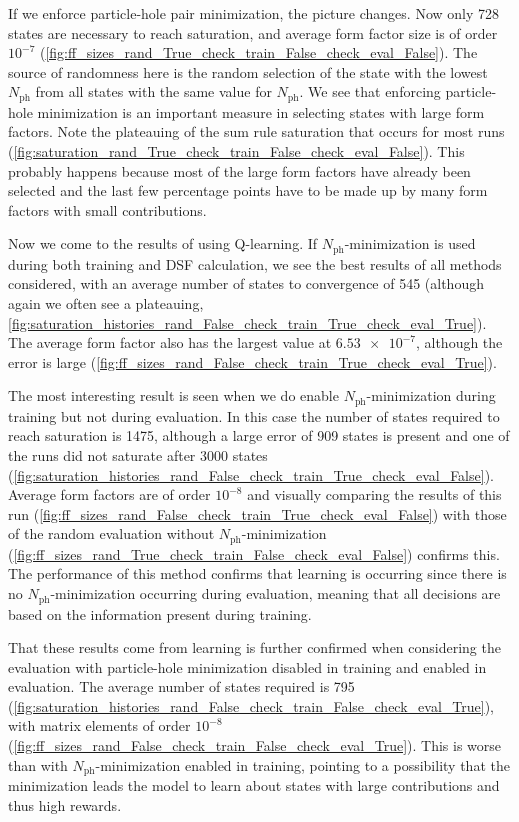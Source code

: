 \documentclass[11pt, a4paper]{report} %
\begin{document}
If we enforce particle-hole pair minimization, the picture changes.
Now only 728 states are necessary to reach saturation, and average form factor size is of order \(10^{-7}\) (\cref{fig:ff_sizes_rand_True_check_train_False_check_eval_False}).
The source of randomness here is the random selection of the state with the lowest \(N_{\mathrm{ph}}\) from all states with the same value for \(N_{\mathrm{ph}}\).
We see that enforcing particle-hole minimization is an important measure in selecting states with large form factors.
Note the plateauing of the sum rule saturation that occurs for most runs (\cref{fig:saturation_rand_True_check_train_False_check_eval_False}). 
This probably happens because most of the large form factors have already been selected and the last few percentage points have to be made up by many form factors with small contributions.


Now we come to the results of using Q-learning.
If \(N_{\mathrm{ph}}\)-minimization is used during both training and DSF calculation, we see the best results of all methods considered, with an average number of states to convergence of 545 (although again we often see a plateauing, \cref{fig:saturation_histories_rand_False_check_train_True_check_eval_True}).
The average form factor also has the largest value at $\num{6.53e-7}$, although the error is large (\cref{fig:ff_sizes_rand_False_check_train_True_check_eval_True}).



The most interesting result is seen when we do enable \(N_{\mathrm{ph}}\)-minimization during training but not during evaluation.
In this case the number of states required to reach saturation is 1475, although a large error of 909 states is present and one of the runs did not saturate after 3000 states (\cref{fig:saturation_histories_rand_False_check_train_True_check_eval_False}).
Average form factors are of order \(10^{-8}\) and visually comparing the results of this run (\cref{fig:ff_sizes_rand_False_check_train_True_check_eval_False}) with those of the random evaluation without \(N_{\mathrm{ph}}\)-minimization (\cref{fig:ff_sizes_rand_True_check_train_False_check_eval_False}) confirms this.
The performance of this method confirms that learning is occurring since there is no \(N_{\mathrm{ph}}\)-minimization occurring during evaluation, meaning that all decisions are based on the information present during training.


That these results come from learning is further confirmed when considering the evaluation with particle-hole minimization disabled in training and enabled in evaluation.
The average number of states required is 795 (\cref{fig:saturation_histories_rand_False_check_train_False_check_eval_True}), with matrix elements of order \(10^{-8}\) (\cref{fig:ff_sizes_rand_False_check_train_False_check_eval_True}).
This is worse than with \(N_{\mathrm{ph}}\)-minimization enabled in training, pointing to a possibility that the minimization leads the model to learn about states with large contributions and thus high rewards.
\end{document}
